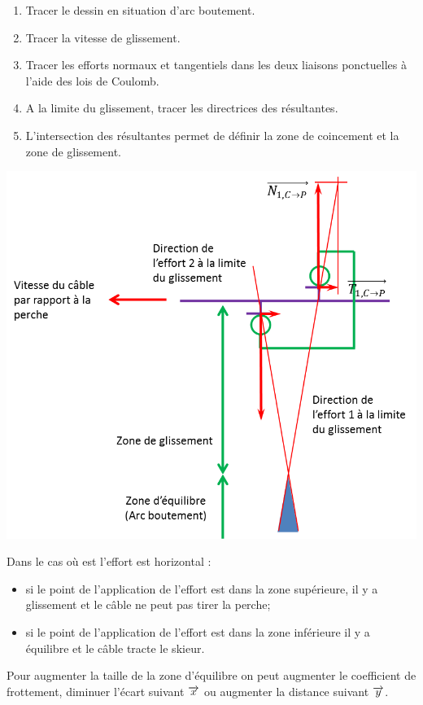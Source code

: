 \documentclass[11pt,oneside]{article}
\begin{document}
\begin{methode}
\begin{enumerate}
\item Tracer le dessin en situation d'arc boutement.
\item Tracer la vitesse de glissement.
\item Tracer les efforts normaux et tangentiels dans les deux liaisons ponctuelles à l'aide des lois de Coulomb.
\item A la limite du glissement, tracer les directrices des résultantes. 
\item L'intersection des résultantes permet de définir la zone de coincement et la zone de glissement. 
\end{enumerate}
\end{methode}

\begin{center}
\includegraphics[width=.7\textwidth]{png/arc3}
\end{center}

Dans le cas où est l'effort est horizontal :
\begin{itemize}
\item si le point de l'application de l'effort est dans la zone supérieure, il y a glissement et le câble ne peut pas tirer la perche;
\item si le point de l'application de l'effort est dans la zone inférieure il y a équilibre et le câble tracte le skieur. 
\end{itemize}

Pour augmenter la taille de la zone d'équilibre on peut augmenter le coefficient de frottement, diminuer l'écart suivant $\overrightarrow{x}$ ou augmenter la distance suivant $\overrightarrow{y}$.

\begin{thebibliography}{2}
\end{thebibliography}
\end{document}

